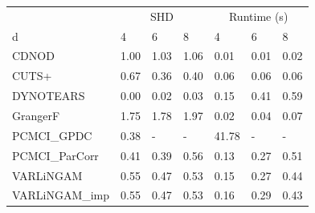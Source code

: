 \begin{tabular}{lllllll}
\toprule
 & \multicolumn{3}{c}{SHD} & \multicolumn{3}{c}{Runtime (s)} \\
d & 4 & 6 & 8 & 4 & 6 & 8 \\
\midrule
CDNOD & 1.00 & 1.03 & 1.06 & 0.01 & 0.01 & 0.02 \\
CUTS+ & 0.67 & 0.36 & 0.40 & 0.06 & 0.06 & 0.06 \\
DYNOTEARS & 0.00 & 0.02 & 0.03 & 0.15 & 0.41 & 0.59 \\
GrangerF & 1.75 & 1.78 & 1.97 & 0.02 & 0.04 & 0.07 \\
PCMCI\_GPDC & 0.38 & - & - & 41.78 & - & - \\
PCMCI\_ParCorr & 0.41 & 0.39 & 0.56 & 0.13 & 0.27 & 0.51 \\
VARLiNGAM & 0.55 & 0.47 & 0.53 & 0.15 & 0.27 & 0.44 \\
VARLiNGAM\_imp & 0.55 & 0.47 & 0.53 & 0.16 & 0.29 & 0.43 \\
\bottomrule
\end{tabular}
